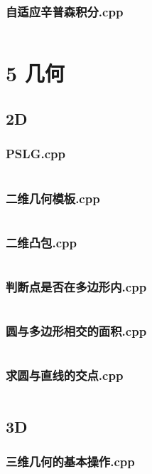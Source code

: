 \documentclass{article}
\begin{document}
\subsubsection{自适应辛普森积分.cpp}
\inputminted{c++}{/home/zzuzxy/t2/ACM-template/4 数学/自适应辛普森积分.cpp}
\section{5 几何}
\subsection{2D}
\subsubsection{PSLG.cpp}
\inputminted{c++}{/home/zzuzxy/t2/ACM-template/5 几何/2D/PSLG.cpp}
\subsubsection{二维几何模板.cpp}
\inputminted{c++}{/home/zzuzxy/t2/ACM-template/5 几何/2D/二维几何模板.cpp}
\subsubsection{二维凸包.cpp}
\inputminted{c++}{/home/zzuzxy/t2/ACM-template/5 几何/2D/二维凸包.cpp}
\subsubsection{判断点是否在多边形内.cpp}
\inputminted{c++}{/home/zzuzxy/t2/ACM-template/5 几何/2D/判断点是否在多边形内.cpp}
\subsubsection{圆与多边形相交的面积.cpp}
\inputminted{c++}{/home/zzuzxy/t2/ACM-template/5 几何/2D/圆与多边形相交的面积.cpp}
\subsubsection{求圆与直线的交点.cpp}
\inputminted{c++}{/home/zzuzxy/t2/ACM-template/5 几何/2D/求圆与直线的交点.cpp}
\subsection{3D}
\subsubsection{三维几何的基本操作.cpp}
\inputminted{c++}{/home/zzuzxy/t2/ACM-template/5 几何/3D/三维几何的基本操作.cpp}
\end{document}
